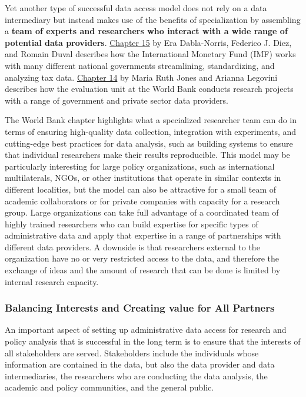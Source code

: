 \documentclass[
]{WileySix}
\begin{document}
Yet another type of successful data access model does not rely on a data intermediary but instead makes use of the benefits of specialization by assembling a \textbf{team of experts and researchers who interact with a wide range of potential data providers}. \protect\hyperlink{imf}{Chapter 15} by Era Dabla-Norris, Federico J. Diez, and Romain Duval describes how the International Monetary Fund (IMF) works with many different national governments streamlining, standardizing, and analyzing tax data. \protect\hyperlink{dime}{Chapter 14} by Maria Ruth Jones and Arianna Legovini describes how the evaluation unit at the World Bank conducts research projects with a range of government and private sector data providers.

The World Bank chapter highlights what a specialized researcher team can do in terms of ensuring high-quality data collection, integration with experiments, and cutting-edge best practices for data analysis, such as building systems to ensure that individual researchers make their results reproducible. This model may be particularly interesting for large policy organizations, such as international multilaterals, NGOs, or other institutions that operate in similar contexts in different localities, but the model can also be attractive for a small team of academic collaborators or for private companies with capacity for a research group. Large organizations can take full advantage of a coordinated team of highly trained researchers who can build expertise for specific types of administrative data and apply that expertise in a range of partnerships with different data providers. A downside is that researchers external to the organization have no or very restricted access to the data, and therefore the exchange of ideas and the amount of research that can be done is limited by internal research capacity.

\hypertarget{balancing-interests-and-creating-value-for-all-partners}{%
\subsubsection{Balancing Interests and Creating value for All Partners}\label{balancing-interests-and-creating-value-for-all-partners}}

An important aspect of setting up administrative data access for research and policy analysis that is successful in the long term is to ensure that the interests of all stakeholders are served. Stakeholders include the individuals whose information are contained in the data, but also the data provider and data intermediaries, the researchers who are conducting the data analysis, the academic and policy communities, and the general public.
\end{document}
